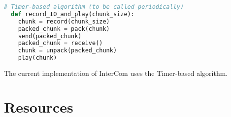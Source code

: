 \begin{lstlisting}[language=Python]
  # Timer-based algorithm (to be called periodically)
  def record_IO_and_play(chunk_size):
    chunk = record(chunk_size)
    packed_chunk = pack(chunk)
    send(packed_chunk)
    packed_chunk = receive()
    chunk = unpack(packed_chunk)
    play(chunk)
\end{lstlisting}


The current implementation of InterCom uses the Timer-based algorithm.

\section{Resources}


